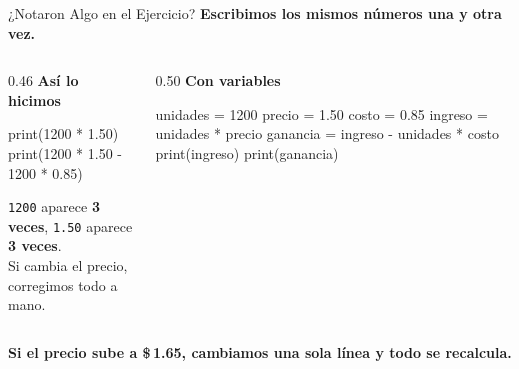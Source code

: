 \documentclass[aspectratio=169, 11pt]{beamer}
\begin{document}
\begin{frame}[fragile]{¿Notaron Algo en el Ejercicio?}
  \vspace{-6pt}
  {\small\color{arcaDark}\bfseries
    Escribimos los mismos números una y otra vez.}

  \vspace{4pt}
  \begin{columns}[T]
    \begin{column}{0.46\textwidth}
      {\scriptsize\color{arcaRed}\bfseries\faTimesCircle\hspace{4pt}%
        Así lo hicimos}
      \vspace{2pt}
      \begin{pyblock}
print(1200 * 1.50)
print(1200 * 1.50 - 1200 * 0.85)
      \end{pyblock}

      \vspace{3pt}
      {\scriptsize\color{textMuted}
        \texttt{1200} aparece \textbf{3 veces},
        \texttt{1.50} aparece \textbf{3 veces}.\\[1pt]
        Si cambia el precio, corregimos todo
        a mano.}
    \end{column}

    \begin{column}{0.50\textwidth}
      {\scriptsize\color{codeGreen}\bfseries\faCheckCircle\hspace{4pt}%
        Con variables}
      \vspace{2pt}
      \begin{pyblock}
unidades = 1200
precio = 1.50
costo = 0.85
ingreso = unidades * precio
ganancia = ingreso - unidades * costo
print(ingreso)
print(ganancia)
      \end{pyblock}
    \end{column}
  \end{columns}

  \vspace{3pt}
  {\scriptsize\color{arcaDark}\bfseries
    Si el precio sube a \$\,1.65, cambiamos
    \textbf{una sola línea} y todo se recalcula.}
\end{frame}
\end{document}
